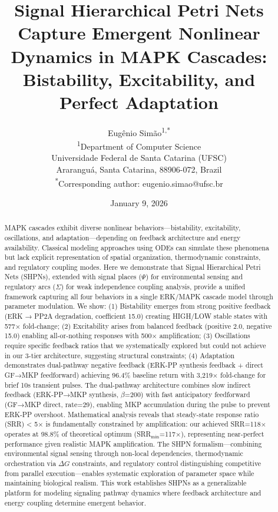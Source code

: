 \documentclass[twocolumn,11pt]{article}
\title{\textbf{Signal Hierarchical Petri Nets Capture Emergent Nonlinear Dynamics in MAPK Cascades: Bistability, Excitability, and Perfect Adaptation}}
\author{
Eugênio Simão\textsuperscript{1,*}\\
\textsuperscript{1}Department of Computer Science\\
Universidade Federal de Santa Catarina (UFSC)\\
Araranguá, Santa Catarina, 88906-072, Brazil\\
\textsuperscript{*}Corresponding author: eugenio.simao@ufsc.br
}
\date{January 9, 2026}
\begin{document}
\maketitle

\begin{abstract}
MAPK cascades exhibit diverse nonlinear behaviors—bistability, excitability, oscillations, and adaptation—depending on feedback architecture and energy availability. Classical modeling approaches using ODEs can simulate these phenomena but lack explicit representation of spatial organization, thermodynamic constraints, and regulatory coupling modes. Here we demonstrate that Signal Hierarchical Petri Nets (SHPNs), extended with signal places ($\Psi$) for environmental sensing and regulatory arcs ($\Sigma$) for weak independence coupling analysis, provide a unified framework capturing all four behaviors in a single ERK/MAPK cascade model through parameter modulation. We show: (1) Bistability emerges from strong positive feedback (ERK → PP2A degradation, coefficient 15.0) creating HIGH/LOW stable states with 577× fold-change; (2) Excitability arises from balanced feedback (positive 2.0, negative 15.0) enabling all-or-nothing responses with 500× amplification; (3) Oscillations require specific feedback ratios that we systematically explored but could not achieve in our 3-tier architecture, suggesting structural constraints; (4) Adaptation demonstrates dual-pathway negative feedback (ERK-PP synthesis feedback + direct GF→MKP feedforward) achieving 96.4\% baseline return with 3,219× fold-change for brief 10s transient pulses. The dual-pathway architecture combines slow indirect feedback (ERK-PP→MKP synthesis, $\beta$=200) with fast anticipatory feedforward (GF→MKP direct, rate=29), enabling MKP accumulation during the pulse to prevent ERK-PP overshoot. Mathematical analysis reveals that steady-state response ratio (SRR) < 5× is fundamentally constrained by amplification: our achieved SRR=118× operates at 98.8\% of theoretical optimum (SRR$_{\text{min}}$=117×), representing near-perfect performance given realistic MAPK amplification. The SHPN formalism—combining environmental signal sensing through non-local dependencies, thermodynamic orchestration via $\Delta G$ constraints, and regulatory control distinguishing competitive from parallel execution—enables systematic exploration of parameter space while maintaining biological realism. This work establishes SHPNs as a generalizable platform for modeling signaling pathway dynamics where feedback architecture and energy coupling determine emergent behavior.
\end{abstract}
\end{document}
